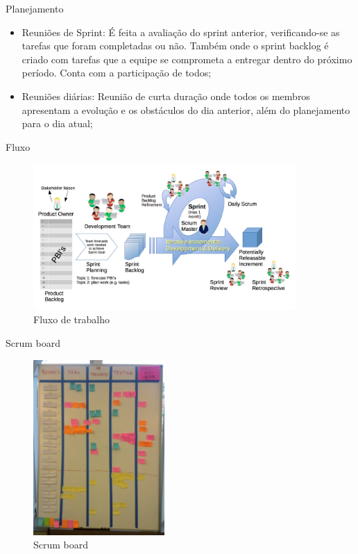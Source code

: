 \begin{frame}{Planejamento}
  \begin{itemize}[<+->]
    \item Reuniões de Sprint: É feita a avaliação do sprint anterior, verificando-se as tarefas que foram completadas ou não. Também onde o sprint backlog é criado com tarefas que a equipe se comprometa a entregar dentro do próximo período. Conta com a participação de todos;
    \item Reuniões diárias: Reunião de curta duração onde todos os membros apresentam a evolução e os obstáculos do dia anterior, além do planejamento para o dia atual;
  \end{itemize}
\end{frame}

\begin{frame}{Fluxo}
  \begin{figure}
    \includegraphics[width=10cm]{fig/scrum}
    \caption{Fluxo de trabalho}
    \label{fig:scrum}
  \end{figure}
\end{frame}

\begin{frame}{Scrum board}
  \begin{figure}
    \includegraphics[width=5cm]{fig/board}
    \caption{Scrum board}
    \label{fig:board}
  \end{figure}
\end{frame}


